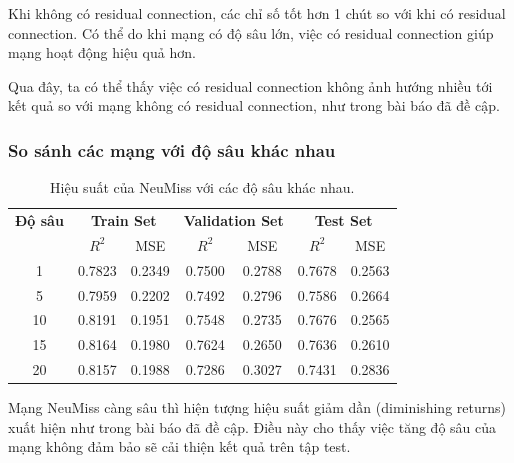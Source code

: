 Khi không có residual connection, các chỉ số tốt hơn 1 chút so với khi có residual connection. Có thể do khi mạng có độ sâu lớn, việc có residual connection giúp mạng hoạt động hiệu quả hơn.

Qua đây, ta có thể thấy việc có residual connection không ảnh hướng nhiều tới kết quả so với mạng không có residual connection, như trong bài báo \cite{le2020neumiss} đã đề cập.


\subsubsection*{So sánh các mạng với độ sâu khác nhau}

\begin{table}[h!]
\centering
\setlength{\tabcolsep}{8pt}
\begin{tabular}{ccccccc}
\toprule
\textbf{Độ sâu} & \multicolumn{2}{c}{\textbf{Train Set}} & \multicolumn{2}{c}{\textbf{Validation Set}} & \multicolumn{2}{c}{\textbf{Test Set}} \\
\cmidrule(lr){2-3}\cmidrule(lr){4-5}\cmidrule(lr){6-7}
 & $R^2$ & MSE & $R^2$ & MSE & $R^2$ & MSE \\
\midrule
1  & 0.7823 & 0.2349 & 0.7500 & 0.2788 & 0.7678 & 0.2563 \\
5  & 0.7959 & 0.2202 & 0.7492 & 0.2796 & 0.7586 & 0.2664 \\
10 & 0.8191 & 0.1951 & 0.7548 & 0.2735 & 0.7676 & 0.2565 \\
15 & 0.8164 & 0.1980 & 0.7624 & 0.2650 & 0.7636 & 0.2610 \\
20 & 0.8157 & 0.1988 & 0.7286 & 0.3027 & 0.7431 & 0.2836 \\
\bottomrule
\end{tabular}
\captionsetup{justification=centering, width=\linewidth}
\caption{Hiệu suất của NeuMiss với các độ sâu khác nhau.}
\label{tab:performance-depths}
\end{table}

Mạng NeuMiss càng sâu thì hiện tượng hiệu suất giảm dần (diminishing returns) xuất hiện như trong bài báo \cite{le2020neumiss} đã đề cập. 
Điều này cho thấy việc tăng độ sâu của mạng không đảm bảo sẽ cải thiện kết quả trên tập test.


